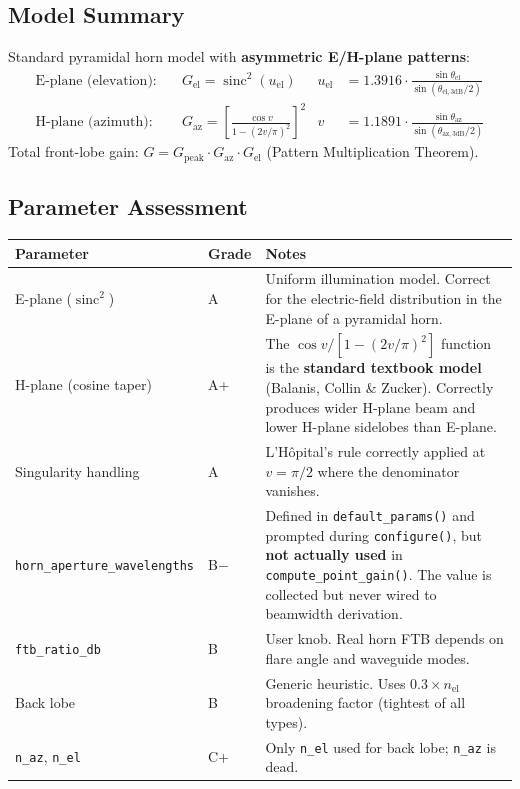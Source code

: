\documentclass[11pt,a4paper]{article}
\DeclareMathOperator{\sinc}{sinc}
\begin{document}
\subsection{Model Summary}

Standard pyramidal horn model with \textbf{asymmetric E/H-plane patterns}:
\begin{align}
    \text{E-plane (elevation):}\quad & G_\text{el} = \sinc^2(u_\text{el})
        & u_\text{el} &= 1.3916 \cdot \frac{\sin\theta_\text{el}}{\sin(\theta_{\text{el},3\text{dB}}/2)} \\
    \text{H-plane (azimuth):}\quad & G_\text{az} = \left[\frac{\cos v}{1 - (2v/\pi)^2}\right]^{2}
        & v &= 1.1891 \cdot \frac{\sin\theta_\text{az}}{\sin(\theta_{\text{az},3\text{dB}}/2)}
\end{align}
Total front-lobe gain: $G = G_\text{peak} \cdot G_\text{az} \cdot G_\text{el}$ (Pattern Multiplication Theorem).

\subsection{Parameter Assessment}

\begin{longtable}{@{}llp{6cm}@{}}
\toprule
\textbf{Parameter} & \textbf{Grade} & \textbf{Notes} \\
\midrule
\endhead
E-plane ($\sinc^2$) & A & Uniform illumination model. Correct for the electric-field distribution in the E-plane of a pyramidal horn. \\
H-plane (cosine taper) & A+ & The $\cos v / [1-(2v/\pi)^2]$ function is the \textbf{standard textbook model} (Balanis, Collin \& Zucker). Correctly produces wider H-plane beam and lower H-plane sidelobes than E-plane. \\
Singularity handling & A & L'H\^opital's rule correctly applied at $v = \pi/2$ where the denominator vanishes. \\
\texttt{horn\_aperture\_wavelengths} & B$-$ & Defined in \texttt{default\_params()} and prompted during \texttt{configure()}, but \textbf{not actually used} in \texttt{compute\_point\_gain()}. The value is collected but never wired to beamwidth derivation. \\
\texttt{ftb\_ratio\_db} & B & User knob. Real horn FTB depends on flare angle and waveguide modes. \\
Back lobe & B & Generic heuristic. Uses $0.3 \times n_\text{el}$ broadening factor (tightest of all types). \\
\texttt{n\_az}, \texttt{n\_el} & C+ & Only \texttt{n\_el} used for back lobe; \texttt{n\_az} is dead. \\
\bottomrule
\end{longtable}
\end{document}
